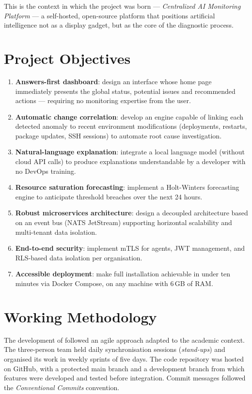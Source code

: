 This is the context in which the \textbf{\caimp{}} project was born ---
\textit{Centralized AI Monitoring Platform} --- a self-hosted, open-source
platform that positions artificial intelligence not as a display gadget, but as
the core of the diagnostic process.

\section{Project Objectives}

\begin{enumerate}[label=\textbf{O\arabic*.}, leftmargin=2.2cm]
  \item \textbf{Answers-first dashboard}: design an interface whose home page
    immediately presents the global status, potential issues and recommended
    actions — requiring no monitoring expertise from the user.
  \item \textbf{Automatic change correlation}: develop an engine capable of
    linking each detected anomaly to recent environment modifications
    (deployments, restarts, package updates, SSH sessions) to automate root
    cause investigation.
  \item \textbf{Natural-language explanation}: integrate a local language model
    (without cloud API calls) to produce explanations understandable by a
    developer with no DevOps training.
  \item \textbf{Resource saturation forecasting}: implement a Holt-Winters
    forecasting engine to anticipate threshold breaches over the next 24 hours.
  \item \textbf{Robust microservices architecture}: design a decoupled architecture
    based on an event bus (NATS JetStream) supporting horizontal scalability and
    multi-tenant data isolation.
  \item \textbf{End-to-end security}: implement mTLS for agents, JWT management,
    and RLS-based data isolation per organisation.
  \item \textbf{Accessible deployment}: make full installation achievable in
    under ten minutes via Docker Compose, on any machine with 6\,GB of RAM.
\end{enumerate}

\section{Working Methodology}

The development of \caimp{} followed an agile approach adapted to the academic
context. The three-person team held daily synchronisation sessions
(\textit{stand-ups}) and organised its work in weekly sprints of five days.
The code repository was hosted on GitHub, with a protected main branch and a
development branch from which features were developed and tested before
integration. Commit messages followed the \textit{Conventional Commits}
convention.


